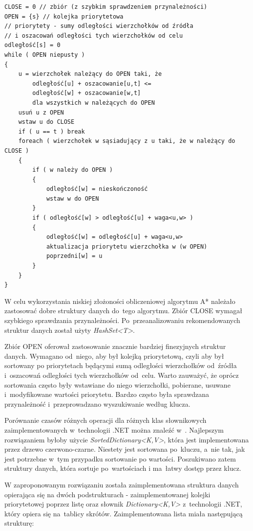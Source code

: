 \documentclass[a4paper,11pt,twoside,openright]{report}
\theoremstyle{definition}
\begin{document}
\begin{verbatim}
CLOSE = 0 // zbiór (z szybkim sprawdzeniem przynależności)
OPEN = {s} // kolejka priorytetowa
// priorytety - sumy odległości wierzchołków od źródła
// i oszacowań odległości tych wierzchołków od celu
odległość[s] = 0
while ( OPEN niepusty )
{
    u = wierzchołek należący do OPEN taki, że
        odległość[u] + oszacowanie[u,t] <=
        odległość[w] + oszacowanie[w,t]
        dla wszystkich w należących do OPEN
    usuń u z OPEN
    wstaw u do CLOSE
    if ( u == t ) break
    foreach ( wierzchołek w sąsiadujący z u taki, że w należący do CLOSE )
    {
        if ( w należy do OPEN )
        {
            odległość[w] = nieskończoność
            wstaw w do OPEN
        }
        if ( odległość[w] > odległość[u] + waga<u,w> )
        {
            odległość[w] = odległość[u] + waga<u,w>
            aktualizacja priorytetu wierzchołka w (w OPEN)
            poprzedni[w] = u
        }
    }
}
\end{verbatim}

W celu wykorzystania niskiej złożoności obliczeniowej algorytmu A*
należało zastosować dobre struktury danych do~tego algorytmu. Zbiór CLOSE
wymagał szybkiego sprawdzania przynależności. Po~przeanalizowaniu rekomendowanych
struktur danych \cite{Dotnet struktury} został użyty \textit{HashSet<T>}.

Zbiór OPEN oferował zastosowanie znacznie bardziej finezyjnych struktur danych.
Wymagano od~niego, aby był kolejką priorytetową, czyli aby był sortowany po
priorytetach będącymi sumą odległości wierzchołków od~źródła i~oszacowań odległości
tych wierzchołków od~celu. Warto zauważyć, że oprócz sortowania często były wstawiane
do niego wierzchołki, pobierane, usuwane i~modyfikowane wartości priorytetu.
Bardzo często była sprawdzana przynależność i~przeprowadzano
wyszukiwanie według klucza.

Porównanie czasów różnych operacji dla różnych klas słownikowych zaimplementowanych
w~technologii .NET można znaleźć w~\cite{C w pigulce}.
Najlepszym rozwiązaniem byłoby użycie \textit{SortedDictionary<K,V>},
która jest implementowana przez drzewo czerwono-czarne. Niestety jest
sortowana po~kluczu, a~nie tak, jak jest potrzebne w~tym przypadku sortowanie
po wartości. Poszukiwano zatem struktury danych, która sortuje po~wartościach
i ma~łatwy dostęp przez klucz.

W zaproponowanym rozwiązaniu została zaimplementowana struktura danych opierająca się
na dwóch podstrukturach - zaimplementowanej kolejki priorytetowej poprzez listę
oraz słownik \textit{Dictionary<K,V>} z~technologii .NET, który opiera się na~tablicy
skrótów. Zaimplementowana lista miała następującą strukturę:
\end{document}
